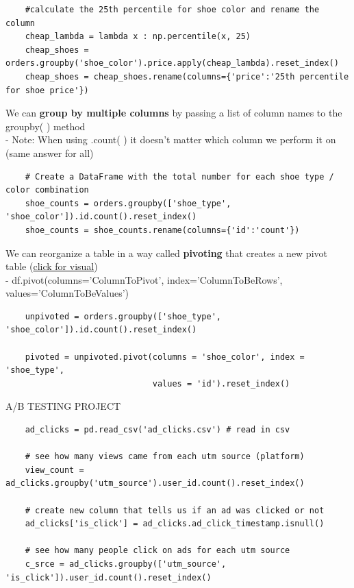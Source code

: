 \documentclass[11pt, a4paper]{article}
\begin{document}
\begin{spacing}{1.1}
\begin{lstlisting}
	#calculate the 25th percentile for shoe color and rename the column
	cheap_lambda = lambda x : np.percentile(x, 25) 
	cheap_shoes = orders.groupby('shoe_color').price.apply(cheap_lambda).reset_index() 
	cheap_shoes = cheap_shoes.rename(columns={'price':'25th percentile for shoe price'}) \end{lstlisting}\vspace*{1mm}
	We can \textbf{group by multiple columns} by passing a list of column names to the groupby( ) method \\
	\hspace*{4mm} - Note: When using .count( ) it doesn't matter which column we perform it on (same answer for all)
	\begin{lstlisting}
	# Create a DataFrame with the total number for each shoe type / color combination
	shoe_counts = orders.groupby(['shoe_type', 'shoe_color']).id.count().reset_index()
	shoe_counts = shoe_counts.rename(columns={'id':'count'}) \end{lstlisting}\vspace*{1mm}
	We can reorganize a table in a way called \textbf{pivoting} that creates a new pivot table (\href{https://pandas.pydata.org/pandas-docs/version/0.24.2/user_guide/reshaping.html}{click for visual})\\
	\hspace*{4mm} - df.pivot(columns='ColumnToPivot', index='ColumnToBeRows', values='ColumnToBeValues')
	\begin{lstlisting}
	unpivoted = orders.groupby(['shoe_type', 'shoe_color']).id.count().reset_index()
	
	pivoted = unpivoted.pivot(columns = 'shoe_color', index = 'shoe_type', 
	                          values = 'id').reset_index() \end{lstlisting} \newpage
	\noindent A/B TESTING PROJECT
	\begin{lstlisting}	
	ad_clicks = pd.read_csv('ad_clicks.csv') # read in csv
	
	# see how many views came from each utm source (platform)
	view_count = ad_clicks.groupby('utm_source').user_id.count().reset_index()
	
	# create new column that tells us if an ad was clicked or not
	ad_clicks['is_click'] = ad_clicks.ad_click_timestamp.isnull()
	
	# see how many people click on ads for each utm source
	c_srce = ad_clicks.groupby(['utm_source', 'is_click']).user_id.count().reset_index()
	

\end{lstlisting}
\end{spacing}
\end{document}
